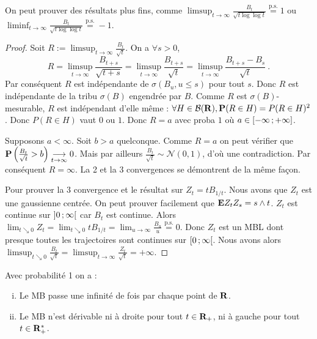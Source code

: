 	\begin{rem}
		On peut prouver des résultats plus fins, comme $\limsup_{t \to \infty} \frac{B_t}{\sqrt{t \log \log t}} \overset{\text{p.s.}}{=} 1$ ou $\liminf_{t \to \infty} \frac{B_t}{\sqrt{t \log \log t}} \overset{\text{p.s.}}{=} -1$.
	\end{rem}
	
	\begin{proof}
		Soit $R := \limsup_{t \to \infty} \frac{B_t}{\sqrt{t}}$.
		On a $\forall s > 0$,
		$$R = \limsup_{t \to \infty} \frac{B_{t + s}}{\sqrt{t + s}} = \limsup_{t \to \infty} \frac{B_{t + s}}{\sqrt{t}} = \limsup_{t \to \infty} \frac{B_{t + s} - B_s}{\sqrt{t}}\ .$$
		Par conséquent $R$ est indépendante de $\sigma(B_u, u \leq s)$ pour tout $s$.
		Donc $R$ est indépendante de la tribu $\sigma(B)$ engendrée par $B$.
		Comme $R$ est $\sigma(B)$-mesurable, $R$ est indépendant d'elle même : $\forall H \in \mathcal{B}(\mathbf{R}), \mathbf{P}(R \in H) = P(R \in H)^2$.
		Donc $P(R \in H)$ vaut $0$ ou $1$.
		Donc $R = a$ avec proba $1$ où $a \in \mathopen{}\mathclose{\left[-\infty\mathclose{}\mathpunct{};+\infty\right]}$.
		
		Supposons $a < \infty$.
		Soit $b > a$ quelconque.
		Comme $R = a$ on peut vérifier que $\mathbf{P} \left( \frac{B_t}{\sqrt{t}} > b \right) \underset{t \to \infty}{\longrightarrow} 0$.
		Mais par ailleurs $\frac{B_t}{\sqrt{t}} \sim \mathcal{N}(0,1)$, d'où une contradiction.
		Par conséquent $R = \infty$.
		La 2 et la 3 convergences se démontrent de la même façon.
		
		Pour prouver la 3 convergence et le résultat sur $Z_t = t B_{1/t}$.
		Nous avons que $Z_t$ est une gaussienne centrée.
		On peut prouver facilement que $\mathbf{E} Z_t Z_s = s \wedge t$.
		$Z_t$ est continue sur $\mathopen{}\mathclose{\left]0\mathclose{}\mathpunct{};\infty\right[}$ car $B_t$ est continue.
		Alors $\lim_{t \searrow 0} Z_t = \lim_{t \searrow 0} t B_{1/t} = \lim_{u \to \infty} \frac{B_u}{u} \overset{\text{p.s.}}{=} 0$.
		Donc $Z_t$ est un MBL dont presque toutes les trajectoires sont continues sur $\mathopen{}\mathclose{\left[0\mathclose{}\mathpunct{};\infty\right[}$.
		Nous avons alors $\limsup_{t \searrow 0} \frac{B_t}{\sqrt{t}} = \limsup_{t \to \infty} \frac{Z_t}{\sqrt{t}} = +\infty$.
	\end{proof}
	
	\begin{cor}
		Avec probabilité 1 on a :
		\begin{enumerate}[(i)]
			\item Le MB passe une infinité de fois par chaque point de $\mathbf{R}$.
			\item Le MB n'est dérivable ni à droite pour tout $t \in \mathbf{R}_+$, ni à gauche pour tout $t \in \mathbf{R}_+^*$.
		\end{enumerate}
	\end{cor}
	
